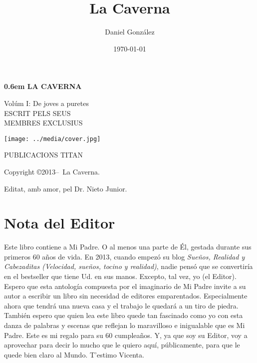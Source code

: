 \documentclass[11pt,twoside,openany]{book}
\title{La Caverna}
\author{
  Daniel Gonz\'alez
}
\date{\today}
\def\secondpage{\clearpage\null\vfill
\pagestyle{empty}
\begin{minipage}[b]{0.9\textwidth}
\footnotesize\raggedright
\setlength{\parskip}{0.5\baselineskip}
Copyright \copyright 2013--\the\year\ La Caverna.\par
Editat, amb amor, pel Dr. Nieto Junior.
\end{minipage}
\vspace*{2\baselineskip}
\cleardoublepage
\rfoot{\thepage}}
\newcommand\blankpage{%
    \null
    \thispagestyle{empty}%
    \addtocounter{page}{-1}%
    \newpage}
\begin{document}
\clearpage
\newcommand\nbvspace[1][3]{\vspace*{\stretch{#1}}}
\newcommand\nbstretchyspace{\spaceskip0.5em plus 0.25em minus 0.25em}
\newcommand{\nbtitlestretch}{\spaceskip0.6em}
\pagestyle{empty}
\begin{center}
\bfseries
\nbvspace[1]
\Huge
{\nbtitlestretch\huge
LA CAVERNA}

\nbvspace[1]
\normalsize

Vol\'um I: De joves a puretes\\

\nbvspace[1]
\small ESCRIT PELS SEUS\\
\Large MEMBRES EXCLUSIUS\\[0.5em]

\nbvspace[2]

\texttt{[image: ../media/cover.jpg]}
\nbvspace[3]
\normalsize

\nbvspace[2]
\large
PUBLICACIONS TITAN
\nbvspace[1]
\end{center}

\afterpage{\blankpage}


\secondpage

\tableofcontents

\chapter*{Nota del Editor}

Este libro contiene a Mi Padre.
O al menos una parte de Él, gestada durante sus primeros 60 años de vida.
En 2013, cuando empezó su blog \emph{Sueños, Realidad y Cabezaditas (Velocidad, sueños, tocino y realidad)}, nadie pensó que se convertiría en el bestseller que tiene Ud. en sus manos.
Excepto, tal vez, yo (el Editor).
Espero que esta antología compuesta por el imaginario de Mi Padre invite a su autor a escribir un libro sin necesidad de editores emparentados.
Especialmente ahora que tendrá una nueva casa y el trabajo le quedará a un tiro de piedra.
También espero que quien lea este libro quede tan fascinado como yo con esta danza de palabras y escenas que reflejan lo maravilloso e inigualable que es Mi Padre.
Este es mi regalo para su 60 cumpleaños.
Y, ya que soy su Editor, voy a aprovechar para decir lo mucho que le quiero aquí, públicamente, para que le quede bien claro al Mundo.
T'estimo Vicenta.
\end{document}
